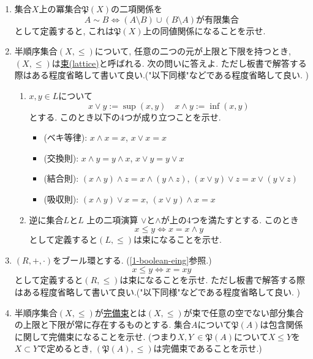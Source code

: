 \documentclass[dvipdfmx,a4paper,11pt]{article}
\theoremstyle{definition}
\begin{document}
  \begin{enumerate}[label=\textbf{問}\ref*{sec-6}.\arabic*]
 \item \label{4-bin} 集合$X$上の冪集合$\mathfrak{P}(X)$の二項関係を
 $$
 A \sim B \Longleftrightarrow
 \text{$(A \setminus B) \cup (B \setminus A)$が有限集合}
 $$
 として定義すると, これは$\mathfrak{P}(X)$上の同値関係になることを示せ. 
 \item  半順序集合$(X, \le)$について, 任意の二つの元が上限と下限を持つとき, $(X, \le)$は\underline{束(lattice)}と呼ばれる.
 次の問いに答えよ. ただし板書で解答する際はある程度省略して書いて良い.("以下同様"などである程度省略して良い. )
    \begin{enumerate}[label=(\arabic*).]
 \setlength{\parskip}{0cm}
  \setlength{\itemsep}{0pt}
  \item $x, y \in L$について
  $$
  x \vee y := \sup(x, y) \quad
  x \wedge y := \inf(x,y)
  $$
  とする. このとき以下の4つが成り立つことを示せ. 
\begin{itemize}
 \setlength{\parskip}{0cm}
  \setlength{\itemsep}{0pt}
     \item (ベキ等律): $x \wedge x =x$, $x \vee x =x$
    \item (交換則): \( x \wedge y = y \wedge x \), \( x \vee y = y \vee x \)
    \item (結合則): \( (x \wedge y) \wedge z = x \wedge (y \wedge z) \), \( (x \vee y) \vee z = x \vee (y \vee z) \)
    \item (吸収則): \( (x \wedge y) \vee x = x \), \( (x \vee y) \wedge x = x \)
\end{itemize}
\item  逆に集合$L$と\( L \) 上の二項演算 \( \vee \)と\( \wedge \)が上の4つを満たすとする. 
 このとき
 $$
 x \le y \Longleftrightarrow  x = x \wedge y
 $$
 として定義すると$(L, \le)$は束になることを示せ. 
  \end{enumerate}
  
 \item $(R, +, \cdot)$をブール環とする. (\ref{1-boolean-eing}参照.)
 $$
  x \le y \Longleftrightarrow  x = xy
 $$
 として定義すると$(R, \le)$は束になることを示せ. ただし板書で解答する際はある程度省略して書いて良い.("以下同様"などである程度省略して良い. )
 
 
 \item \label{3-complete-lattice}半順序集合$(X, \le)$が\underline{完備束}とは$(X, \le)$が束で任意の空でない部分集合の上限と下限が常に存在するものとする.
集合$A$について$\mathfrak{P}(A)$は包含関係に関して完備束になることを示せ.
(つまり$X, Y\ \in \mathfrak{P}(A)$について$X \le Y$を$X \subset Y$で定めるとき, $(\mathfrak{P}(A), \le)$は完備束であることを示せ.)
 

\end{enumerate}
\end{document}
